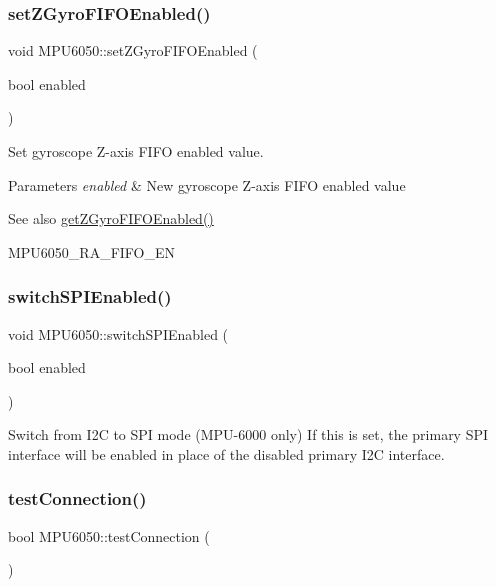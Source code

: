 \subsubsection{\texorpdfstring{setZGyroFIFOEnabled()}{setZGyroFIFOEnabled()}}
{\footnotesize\ttfamily void M\+P\+U6050\+::set\+Z\+Gyro\+F\+I\+F\+O\+Enabled (\begin{DoxyParamCaption}\item[{bool}]{enabled }\end{DoxyParamCaption})}

Set gyroscope Z-\/axis F\+I\+FO enabled value. 
\begin{DoxyParams}{Parameters}
{\em enabled} & New gyroscope Z-\/axis F\+I\+FO enabled value \\
\hline
\end{DoxyParams}
\begin{DoxySeeAlso}{See also}
\mbox{\hyperlink{class_m_p_u6050_adbbbd131c74f37dd545403633eb317ff}{get\+Z\+Gyro\+F\+I\+F\+O\+Enabled()}} 

M\+P\+U6050\+\_\+\+R\+A\+\_\+\+F\+I\+F\+O\+\_\+\+EN 
\end{DoxySeeAlso}
\mbox{\label{class_m_p_u6050_a269710b7bca814bbf67e7bb38c381650}} 
\subsubsection{\texorpdfstring{switchSPIEnabled()}{switchSPIEnabled()}}
{\footnotesize\ttfamily void M\+P\+U6050\+::switch\+S\+P\+I\+Enabled (\begin{DoxyParamCaption}\item[{bool}]{enabled }\end{DoxyParamCaption})}

Switch from I2C to S\+PI mode (M\+P\+U-\/6000 only) If this is set, the primary S\+PI interface will be enabled in place of the disabled primary I2C interface. \mbox{\label{class_m_p_u6050_a95ffab7b44fce3834236e0813687d11a}} 
\subsubsection{\texorpdfstring{testConnection()}{testConnection()}}
{\footnotesize\ttfamily bool M\+P\+U6050\+::test\+Connection (\begin{DoxyParamCaption}{ }\end{DoxyParamCaption})}

